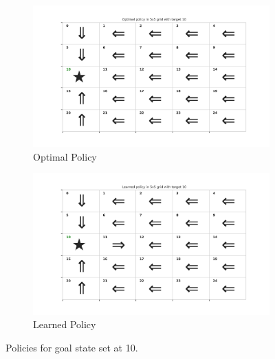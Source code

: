 \begin{figure}[!htbp]
    \centering
    \begin{subfigure}[b]{0.49\linewidth}
        \centering
        \includegraphics[width=\linewidth]{experimentation/images/Optimal policy in 5x5 grid with target 10.png}
        \caption{Optimal Policy}
    \end{subfigure}
    \begin{subfigure}[b]{0.49\linewidth}
        \centering
        \includegraphics[width=\linewidth]{experimentation/images/Learned policy in 5x5 grid with target 10.png}
        \caption{Learned Policy}
    \end{subfigure}
    \caption{Policies for goal state set at 10.}
    \label{fig:policy_10}
\end{figure}

